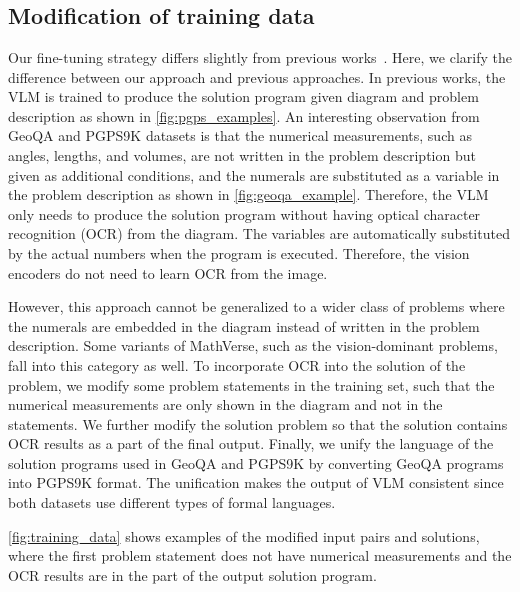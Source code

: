 \section{\geovlm{}}
\label{sec:vlm_details}

\subsection{Modification of training data}

Our fine-tuning strategy differs slightly from previous works~\citep{unigeo,pgps,geox}. 
Here, we clarify the difference between our approach and previous approaches. In previous works, the VLM is trained to produce the solution program given diagram and problem description as shown in \cref{fig:pgps_examples}. An interesting observation from GeoQA and PGPS9K datasets is that the numerical measurements, such as angles, lengths, and volumes, are not written in the problem description but given as additional conditions, and the numerals are substituted as a variable in the problem description as shown in \cref{fig:geoqa_example}. Therefore, the VLM only needs to produce the solution program without having optical character recognition (OCR) from the diagram. The variables are automatically substituted by the actual numbers when the program is executed. Therefore, the vision encoders do not need to learn OCR from the image.

However, this approach cannot be generalized to a wider class of problems where the numerals are embedded in the diagram instead of written in the problem description. Some variants of MathVerse, such as the vision-dominant problems, fall into this category as well. To incorporate OCR into the solution of the problem, we modify some problem statements in the training set, such that the numerical measurements are only shown in the diagram and not in the statements. We further modify the solution problem so that the solution contains OCR results as a part of the final output. Finally, we unify the language of the solution programs used in GeoQA and PGPS9K by converting GeoQA programs into PGPS9K format. The unification makes the output of VLM consistent since both datasets use different types of formal languages.

\cref{fig:training_data} shows examples of the modified input pairs and solutions, where the first problem statement does not have numerical measurements and the OCR results are in the part of the output solution program.


